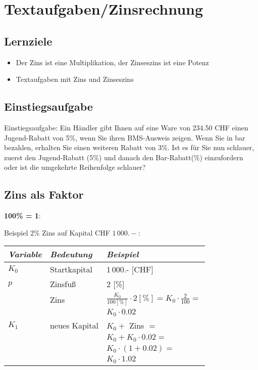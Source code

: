 
\newpage
\section{Textaufgaben/Zinsrechnung}
\subsection*{Lernziele}

\begin{itemize}
  \item Der Zins ist eine  Multiplikation, der Zinseszins ist eine Potenz
\item Textaufgaben mit Zins und Zinseszins
\end{itemize}

\subsection{Einstiegsaufgabe}
Einstiegsaufgabe:
Ein Händler gibt Ihnen auf eine Ware von 234.50 CHF einen Jugend-Rabatt von
5\%, wenn Sie ihren BMS-Ausweis zeigen. Wenn Sie in bar bezahlen, erhalten Sie
einen weiteren Rabatt von 3\%. Ist es für Sie nun schlauer, zuerst den
Jugend-Rabatt (5\%) und danach den Bar-Rabatt(\%) einzufordern oder
ist die umgekehrte Reihenfolge schlauer? 

\subsection{Zins als Faktor}
\textbf{100\% = 1}:

Beispiel $2\%$ Zins auf Kapital CHF $1\,000.-$:\\

\begin{tabular}{l|l|l}
  \textit{Variable}  &   \textit{Bedeutung}   & \textit{Beispiel}\\%
\hline%
 $K_0$             &   Startkapital         & 1\,000.-  [CHF]\\\hline


 $p$               &   Zinsfuß              & 2  [\%]\\\hline

                   & Zins & $\frac{K_0}{100[\%]}\cdot{}2[\%] =
                   K_0 \cdot{} \frac2{100} = $\\
                   & & $K_0\cdot 0.02$ \\\hline

$K_1$            & neues Kapital  &   $K_0+$ Zins $=$ \\
                 &    &   $K_0+K_0\cdot{}0.02 = $ \\
                 &    &   $K_0\cdot(1+0.02) = $\\
                 &    &   $K_0\cdot{}1.02$\\
\end{tabular}
\newpage


